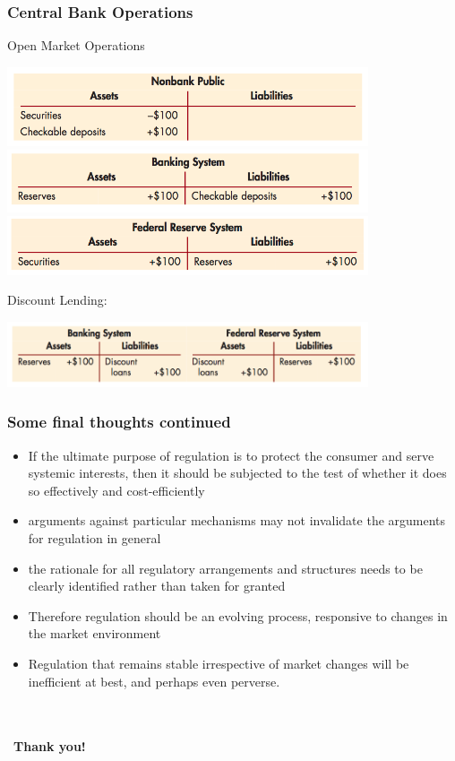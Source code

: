 \documentclass[11pt]{beamer}
\newcommand{\mcdbl}[1]{{{\bf \color{navy}#1}}}
\begin{document}
\begin{frame}
\frametitle{Central Bank Operations}
Open Market Operations
\begin{center}
  \includegraphics[width=0.8\textwidth]{Figures/OMO1.png}\\
  \includegraphics[width=0.8\textwidth]{Figures/OMO2.png}\\
  \includegraphics[width=0.8\textwidth]{Figures/OMO3.png}
\end{center}
Discount Lending:
\begin{center}
  \includegraphics[width=0.8\textwidth]{Figures/DiscountLending1.png}\\
\end{center}
\end{frame}

\begin{frame}
\frametitle{Some final thoughts continued}
\begin{itemize}
\item If the ultimate purpose of regulation is to protect the consumer and serve systemic interests, then it should be subjected to the test of whether it does so effectively and cost-efficiently
\item arguments against particular mechanisms may not invalidate the arguments for regulation in general
\item the rationale for all regulatory arrangements and structures needs to be clearly identified rather than taken for granted
\item Therefore regulation should be an evolving process, responsive to changes in the market environment
\item Regulation that remains stable irrespective of market changes will be inefficient at best, and perhaps even perverse.
\end{itemize}
~\\
~\\
~\hfill \mcdbl{Thank you!}
\end{frame}
\end{document}
